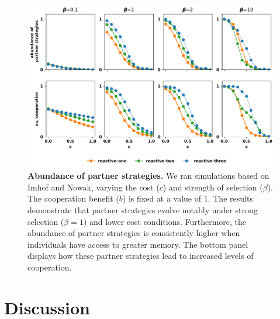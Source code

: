 \documentclass{article}
\theoremstyle{definition}
\begin{document}
\begin{figure}[h!]
  \centering
  \includegraphics[width=\textwidth]{figures/abundance_of_partner_strategies.pdf}
  \caption{\textbf{Abundance of partner strategies.}
  We ran simulations based on Imhof and Nowak, varying the cost ($c$) and
  strength of selection ($\beta$). The cooperation benefit ($b$) is fixed at a
  value of 1. The results demonstrate that partner strategies evolve notably
  under strong selection ($\beta=1$) and lower cost conditions. Furthermore, the abundance
  of partner strategies is consistently higher when individuals have access to
  greater memory. The bottom panel displays how these partner strategies lead to
  increased levels of cooperation.}
\end{figure}

\section{Discussion}

~\\

\end{document}

